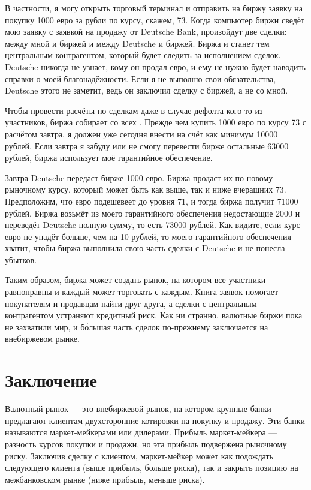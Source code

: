В частности, я могу открыть торговый терминал и отправить на биржу заявку на
покупку \num{1000} евро за рубли по курсу, скажем, \num{73}. Когда компьютер
биржи сведёт мою заявку с заявкой на продажу от Deutsche Bank, произойдут две
сделки: между мной и биржей и между Deutsche и биржей. Биржа и станет тем
центральным контрагентом, который будет следить за исполнением сделок. Deutsche
никогда не узнает, кому он продал евро, и ему не нужно будет наводить справки о
моей благонадёжности. Если я не выполню свои обязательства, Deutsche этого не
заметит, ведь он заключил сделку с биржей, а не со мной.

Чтобы провести расчёты по сделкам даже в случае дефолта кого-то из участников,
биржа собирает со всех . Прежде чем купить
\num{1000} евро по курсу \num{73} с расчётом завтра, я должен уже сегодня внести
на счёт как минимум \num{10000} рублей. Если завтра я забуду или не смогу
перевести бирже остальные \num{63000} рублей, биржа использует моё гарантийное
обеспечение.

Завтра Deutsche передаст бирже \num{1000} евро. Биржа продаст их по новому
рыночному курсу, который может быть как выше, так и ниже вчерашних \num{73}.
Предположим, что евро подешевеет до уровня \num{71}, и тогда биржа получит
\num{71000} рублей. Биржа возьмёт из моего гарантийного обеспечения недостающие
\num{2000} и переведёт Deutsche полную сумму, то есть \num{73000} рублей. Как
видите, если курс евро не упадёт больше, чем на 10 рублей, то моего гарантийного
обеспечения хватит, чтобы биржа выполнила свою часть сделки с Deutsche и не
понесла убытков.

Таким образом, биржа может создать рынок, на котором все участники равноправны и
каждый может торговать с каждым. Книга заявок помогает покупателям и продавцам
найти друг друга, а сделки с центральным контрагентом устраняют кредитный риск.
Как ни странно, валютные биржи пока не захватили мир, и б\'{о}льшая часть сделок
по-прежнему заключается на внебиржевом рынке.

\section*{Заключение}

Валютный рынок --- это внебиржевой рынок, на котором крупные банки предлагают
клиентам двухсторонние котировки на покупку и продажу. Эти банки называются
маркет-мейкерами или дилерами. Прибыль маркет-мейкера --- разность курсов
покупки и продажи, но эта прибыль подвержена рыночному риску. Заключив сделку с
клиентом, маркет-мейкер может как подождать следующего клиента (выше прибыль,
больше риска), так и закрыть позицию на межбанковском рынке (ниже прибыль,
меньше риска).

